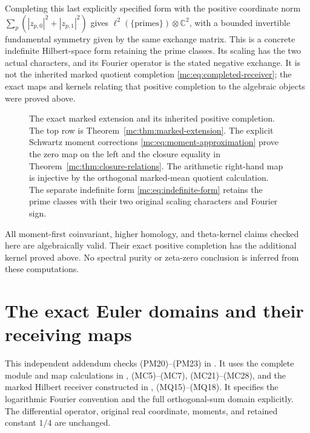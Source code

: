 \documentclass[11pt,a4paper]{article}
\theoremstyle{definition}\newtheorem{definition}[theorem]{Definition}
\newcommand{\C}{\mathbb C}\newcommand{\R}{\mathbb R}
\begin{document}
Completing this last explicitly specified form with the positive
coordinate norm $\sum_p(|z_{p,0}|^2+|z_{p,1}|^2)$ gives
$\ell^2(\{\text{primes}\})\otimes\C^2$, with a bounded
invertible fundamental symmetry given by the same exchange matrix.
This is a concrete indefinite Hilbert-space form retaining the
prime classes. Its scaling has the two actual characters, and its
Fourier operator is the stated negative exchange. It is not the
inherited marked quotient completion \eqref{mc:eq:completed-receiver};
the exact maps and kernels relating that positive completion to
the algebraic objects were proved above.

\begin{figure}[ht]
\centering
{}
\caption{The exact marked extension and its inherited positive
completion. The top row is Theorem~\ref{mc:thm:marked-extension}.
The explicit Schwartz moment corrections
\eqref{mc:eq:moment-approximation} prove the zero map on the left
and the closure equality in Theorem~\ref{mc:thm:closure-relations}.
The arithmetic right-hand map is injective by the orthogonal
marked-mean quotient calculation. The separate indefinite form
\eqref{mc:eq:indefinite-form} retains the prime classes with their
two original scaling characters and Fourier sign.}
\end{figure}

All moment-first coinvariant, higher homology, and theta-kernel
claims checked here are algebraically valid. Their exact positive
completion has the additional kernel proved above. No spectral
purity or zeta-zero conclusion is inferred from these computations.


\section{The exact Euler domains and their receiving maps}


This independent addendum checks (PM20)--(PM23) in
.
It uses the complete module and map calculations in
,
(MC5)--(MC7), (MC21)--(MC28), and the marked Hilbert receiver
constructed in ,
(MQ15)--(MQ18). It specifies the logarithmic Fourier convention
and the full orthogonal-sum domain explicitly. The differential
operator, original real coordinate, moments, and retained constant
$1/4$ are unchanged.
\end{document}
